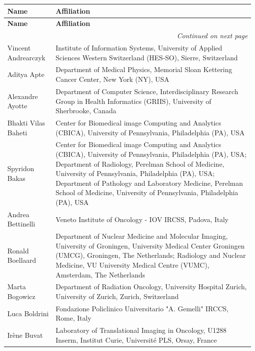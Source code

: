 \documentclass[fleqn,a4paper,oneside,openany]{book}
\begin{document}
\begin{longtable}{p{4cm}p{10cm}}

\toprule
\textbf{Name} & \textbf{Affiliation} \\
\midrule
\endfirsthead

\toprule
\textbf{Name} & \textbf{Affiliation} \\
\midrule
\endhead

\bottomrule
\multicolumn{2}{r}{\textit{Continued on next page}}
\endfoot

\\
\endlastfoot
Vincent Andrearczyk
& Institute of Information Systems, University of Applied Sciences Western Switzerland (HES-SO), Sierre, Switzerland\\ 
Aditya Apte
& Department of Medical Physics, Memorial Sloan Kettering Cancer Center, New York (NY), USA\\ 
Alexandre Ayotte
& Department of Computer Science, Interdisciplinary Research Group in Health Informatics (GRIIS), University of Sherbrooke, Canada\\
Bhakti Vilas Baheti
& Center for Biomedical image Computing and Analytics (CBICA), University of Pennsylvania, Philadelphia (PA), USA\\ 
Spyridon Bakas
& Center for Biomedical image Computing and Analytics (CBICA), University of Pennsylvania, Philadelphia (PA), USA; Department of Radiology, Perelman School of Medicine, University of Pennsylvania, Philadelphia (PA), USA; Department of Pathology and Laboratory Medicine, Perelman School of Medicine, University of Pennsylvania, Philadelphia (PA), USA\\
Andrea Bettinelli
& Veneto Institute of Oncology - IOV IRCSS, Padova, Italy\\
Ronald Boellaard
& Department of Nuclear Medicine and Molecular Imaging, University of Groningen, University Medical Center Groningen (UMCG), Groningen, The Netherlands; Radiology and Nuclear Medicine, VU University Medical Centre (VUMC), Amsterdam, The Netherlands\\ 
Marta Bogowicz
& Department of Radiation Oncology, University Hospital Zurich, University of Zurich, Zurich, Switzerland\\ 
Luca Boldrini
& Fondazione Policlinico Universitario "A. Gemelli" IRCCS, Rome, Italy\\ 
Irène Buvat
& Laboratory of Translational Imaging in Oncology, U1288 Inserm, Institut Curie, Université PLS, Orsay, France \\ 

\end{longtable}
\end{document}
